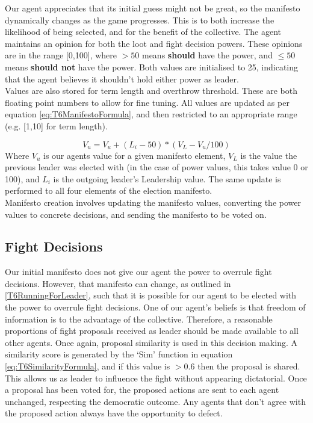 Our agent appreciates that its initial guess might not be great, so the manifesto dynamically changes as the game progresses. This is to both increase the likelihood of being selected, and for the benefit of the collective. The agent maintains an opinion for both the loot and fight decision powers. These opinions are in the range [0,100], where $>50$ means \textbf{should} have the power, and $\leq 50$ means \textbf{should not} have the power. Both values are initialised to 25, indicating that the agent believes it shouldn't hold either power as leader.\\

Values are also stored for term length and overthrow threshold. These are both floating point numbers to allow for fine tuning. All values are updated as per equation \ref{eq:T6ManifestoFormula}, and then restricted to an appropriate range (e.g. [1,10] for term length).

\begin{equation}\label{eq:T6ManifestoFormula}
    V_{u} = V_{u} + (L_{i}-50)*(V_{L}-V_{u}/100)
\end{equation}
Where $V_{u}$ is our agents value for a given manifesto element, $V_{L}$ is the value the previous leader was elected with (in the case of power values, this takes value 0 or 100), and $L_{i}$ is the outgoing leader's Leadership value. The same update is performed to all four elements of the election manifesto.\\

Manifesto creation involves updating the manifesto values, converting the power values to concrete decisions, and sending the manifesto to be voted on.

\subsection{Fight Decisions}

Our initial manifesto does not give our agent the power to overrule fight decisions. However, that manifesto can change, as outlined in \ref{T6RunningForLeader}, such that it is possible for our agent to be elected with the power to overrule fight decisions. One of our agent's beliefs is that freedom of information is to the advantage of the collective. Therefore, a reasonable proportions of fight proposals received as leader should be made available to all other agents. Once again, proposal similarity is used in this decision making. A similarity score is generated by the `Sim' function in equation \ref{eq:T6SimilarityFormula}, and if this value is $>0.6$ then the proposal is shared. This allows us as leader to influence the fight without appearing dictatorial. Once a proposal has been voted for, the proposed actions are sent to each agent unchanged, respecting the democratic outcome. Any agents that don't agree with the proposed action always have the opportunity to defect.

